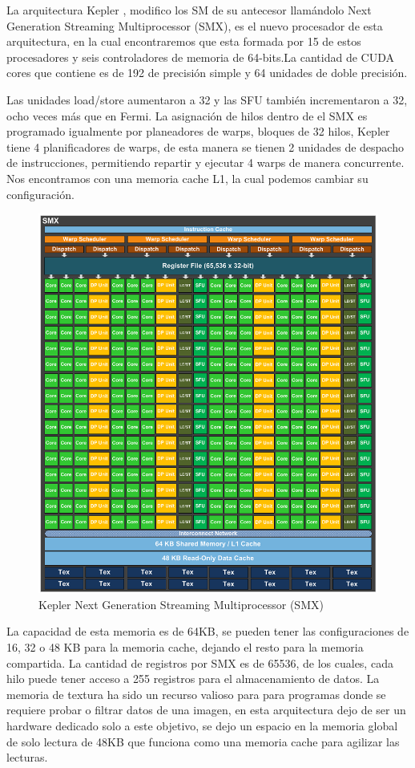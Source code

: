 La arquitectura Kepler \cite{Kepler}, modifico los SM de su antecesor llamándolo Next Generation Streaming Multiprocessor (SMX), es el nuevo procesador de esta arquitectura, en la cual encontraremos que esta formada por 15 de estos procesadores y seis controladores de memoria de 64-bits.La cantidad de CUDA cores que contiene es de 192 de precisión simple y 64 unidades de doble precisión. 

Las unidades load/store aumentaron a 32 y las SFU también incrementaron a 32, ocho veces más que en Fermi. La asignación de hilos dentro de el SMX es programado igualmente por planeadores de warps, bloques de 32 hilos, Kepler tiene 4 planificadores de warps, de esta manera se tienen 2 unidades de despacho de instrucciones, permitiendo repartir y ejecutar 4 warps de manera concurrente. Nos encontramos con una memoria cache L1, la cual podemos cambiar su configuración. 

\begin{figure}[h]
			\centering
				\includegraphics[scale=0.4]{img/KeplerSMX.png}
			\caption{Kepler Next Generation Streaming Multiprocessor (SMX)}
\end{figure}

La capacidad de esta memoria es de 64KB, se pueden tener las configuraciones de 16, 32 o 48 KB para la memoria cache, dejando el resto para la memoria compartida. La cantidad de registros por SMX es de 65536, de los cuales, cada hilo puede tener acceso a 255 registros para el almacenamiento de datos. La memoria de textura ha sido un recurso valioso para para programas donde se requiere probar o filtrar datos de una imagen, en esta arquitectura dejo de ser un hardware dedicado solo a este objetivo, se dejo un espacio en la memoria global de solo lectura de 48KB que funciona como una memoria cache para agilizar las lecturas.



